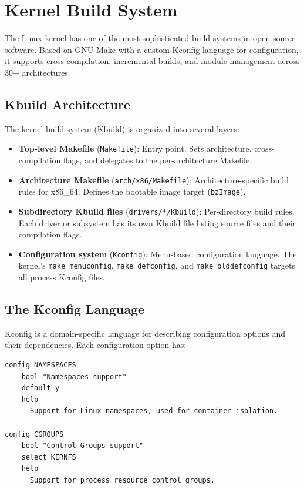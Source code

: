 \chapter{Kernel Build System}
\label{ch:kernelbuild}

The Linux kernel has one of the most sophisticated build systems in open
source software. Based on GNU Make with a custom Kconfig language for
configuration, it supports cross-compilation, incremental builds, and
module management across 30+ architectures.

\section{Kbuild Architecture}

The kernel build system (Kbuild) is organized into several layers:

\begin{itemize}[nosep]
  \item \textbf{Top-level Makefile} (\texttt{Makefile}): Entry point.
        Sets architecture, cross-compilation flags, and delegates to the
        per-architecture Makefile.
  \item \textbf{Architecture Makefile} (\texttt{arch/x86/Makefile}):
        Architecture-specific build rules for x86\_64. Defines the
        bootable image target (\texttt{bzImage}).
  \item \textbf{Subdirectory Kbuild files} (\texttt{drivers/*/Kbuild}):
        Per-directory build rules. Each driver or subsystem has its own
        Kbuild file listing source files and their compilation flags.
  \item \textbf{Configuration system} (\texttt{Kconfig}): Menu-based
        configuration language. The kernel's \texttt{make menuconfig},
        \texttt{make defconfig}, and \texttt{make olddefconfig} targets
        all process Kconfig files.
\end{itemize}

\section{The Kconfig Language}

Kconfig is a domain-specific language for describing configuration options
and their dependencies. Each configuration option has:

\begin{lstlisting}
config NAMESPACES
    bool "Namespaces support"
    default y
    help
      Support for Linux namespaces, used for container isolation.

config CGROUPS
    bool "Control Groups support"
    select KERNFS
    help
      Support for process resource control groups.
\end{lstlisting}

